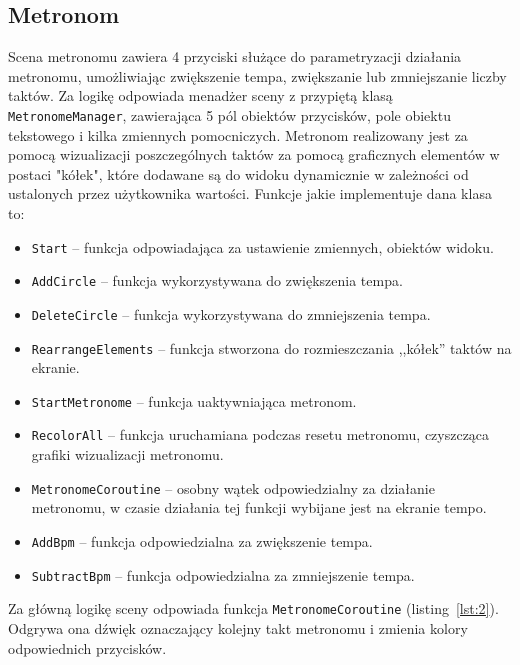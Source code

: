 \subsection{Metronom}

Scena metronomu zawiera 4 przyciski służące do parametryzacji działania metronomu, umożliwiając zwiększenie tempa, zwiększanie lub zmniejszanie liczby taktów. Za logikę odpowiada menadżer sceny z przypiętą klasą \texttt{MetronomeManager}, zawierająca 5 pól obiektów przycisków, pole obiektu tekstowego i kilka zmiennych pomocniczych. Metronom realizowany jest za pomocą wizualizacji poszczególnych taktów za pomocą graficznych elementów w postaci "kółek", które dodawane są do widoku dynamicznie w zależności od ustalonych przez użytkownika wartości. Funkcje jakie implementuje dana klasa to:

\begin{itemize}
    \item \texttt{Start} -- funkcja odpowiadająca za ustawienie zmiennych, obiektów widoku. 
    \item \texttt{AddCircle} -- funkcja wykorzystywana do zwiększenia tempa.
    \item \texttt{DeleteCircle} -- funkcja wykorzystywana do zmniejszenia tempa.
    \item \texttt{RearrangeElements} -- funkcja stworzona do rozmieszczania ,,kółek'' taktów na ekranie.
    \item \texttt{StartMetronome} -- funkcja uaktywniająca metronom.
    \item \texttt{RecolorAll} -- funkcja uruchamiana podczas resetu metronomu, czyszcząca grafiki wizualizacji metronomu.
    \item \texttt{MetronomeCoroutine} -- osobny wątek odpowiedzialny za działanie metronomu, w czasie działania tej funkcji wybijane jest na ekranie tempo.
    \item \texttt{AddBpm} -- funkcja odpowiedzialna za zwiększenie tempa.
    \item \texttt{SubtractBpm} -- funkcja odpowiedzialna za zmniejszenie tempa.
\end{itemize}

Za główną logikę sceny odpowiada funkcja \texttt{MetronomeCoroutine} (listing~\ref{lst:2}). Odgrywa ona dźwięk oznaczający kolejny takt metronomu i zmienia kolory odpowiednich przycisków.

